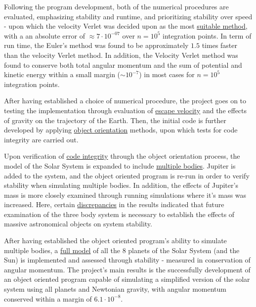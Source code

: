 \documentclass[%
oneside,                 %
final,                   %
10pt]{article}
\begin{document}
Following the program development, both of the numerical procedures are evaluated, emphasizing stability and runtime, and prioritizing stability over speed - upon which the velocity Verlet was decided upon as the most \hyperref[subsec:Discofres:initimpl]{suitable method}, with a an absolute error of $\approx 7 \cdot 10^{-07}$ over $n=10^5$ integration points. In term of run time, the Euler's method was found to be approximately $1.5$ times faster than the velocity Verlet method. In addition, the Velocity Verlet method was found to conserve both total angular momentum and the sum of potential and kinetic energy within a small margin ($\sim 10^{-7}$) in most cases for $n=10^5$ integration points. \newline

After having established a choice of numerical procedure, the project goes on to testing the implementation through evaluation of \hyperref[subsec:vesc]{escape velocity} and the effects of gravity on the trajectory of the Earth. Then, the initial code is further developed by applying \hyperref[sec:OOing]{object orientation} methods, upon which tests for code integrity are carried out. \newline

Upon verification of \hyperref[subsec:OOverification]{code integrity} through the object orientation process, the model of the Solar System is expanded to include \hyperref[sec:Modmultibody]{multiple bodies}. Jupiter is added to the system, and the object oriented program is re-run in order to verify stability when simulating multiple bodies. In addition, the effects of Jupiter's mass is more closely examined through running simulations where it's mass was increased. Here, certain \hyperref[subsec:Discofres:3B]{discrepancies} in the results indicated that future examination of the three body system is necessary to establish the effects of massive astronomical objects on system stability.\newline

After having established the object oriented program's ability to simulate multiple bodies, a \hyperref[subsec:SSsim]{full model} of all the 8 planets of the Solar System (and the Sun) is implemented and assessed through stability - measured in conservation of angular momentum. The project's main results is the successfully development of an object oriented program capable of simulating a simplified version of the solar system using all planets and Newtonian gravity, with angular momentum conserved within a margin of $6.1 \cdot 10^{-8}$. \newline
\end{document}
